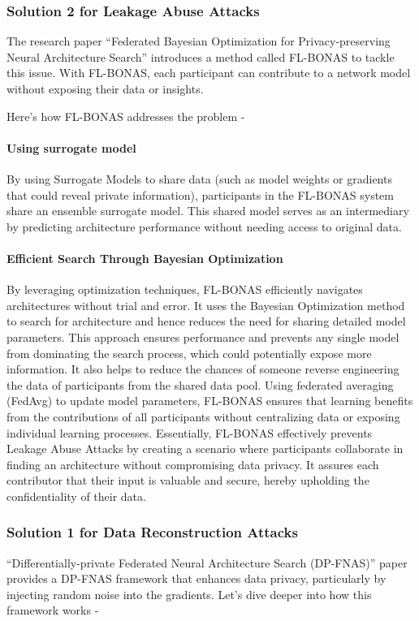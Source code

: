 \documentclass[conference]{IEEEtran}
\begin{document}
\subsubsection{\textbf{Solution 2 for Leakage Abuse Attacks}} 
The research paper \enquote{Federated Bayesian Optimization for Privacy-preserving Neural Architecture Search} introduces a method called FL-BONAS to tackle this issue. With FL-BONAS, each participant can contribute to a network model without exposing their data or insights.

Here's how FL-BONAS addresses the problem -
\paragraph{Using surrogate model}By using Surrogate Models to share data (such as model weights or gradients that could reveal private information), participants in the FL-BONAS system share an ensemble surrogate model. This shared model serves as an intermediary by predicting architecture performance without needing access to original data.
\paragraph{Efficient Search Through Bayesian Optimization} By leveraging optimization techniques, FL-BONAS efficiently navigates architectures without trial and error. It uses the Bayesian Optimization method to search for architecture and hence reduces the need for sharing detailed model parameters. This approach ensures performance and prevents any single model from dominating the search process, which could potentially expose more information. It also helps to reduce the chances of someone reverse engineering the data of participants from the shared data pool.
Using federated averaging (FedAvg) to update model parameters, FL-BONAS ensures that learning benefits from the contributions of all participants without centralizing data or exposing individual learning processes.
Essentially, FL-BONAS effectively prevents Leakage Abuse Attacks by creating a scenario where participants collaborate in finding an architecture without compromising data privacy. It assures each contributor that their input is valuable and secure, hereby upholding the confidentiality of their data.

\subsubsection{\textbf{Solution 1 for Data Reconstruction Attacks}}
\enquote{Differentially-private Federated Neural Architecture Search (DP-FNAS)} paper provides a DP-FNAS framework that enhances data privacy, particularly by injecting random noise into the gradients. Let's dive deeper into how this framework works -
\end{document}
